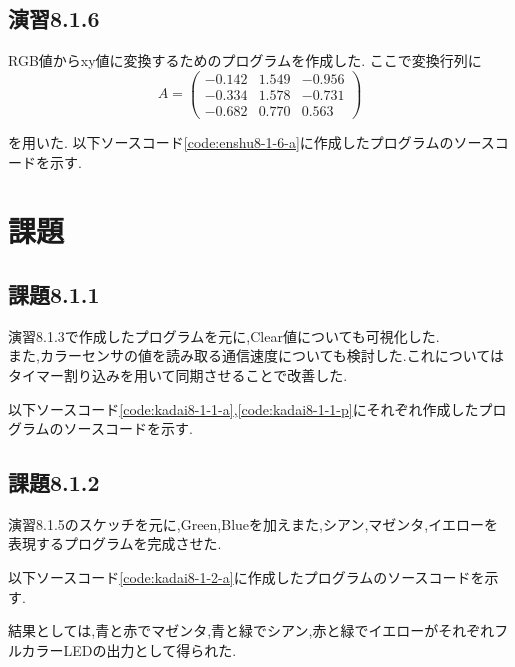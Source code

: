 \documentclass{jarticle}
\begin{document}
\subsection{演習8.1.6}
RGB値からxy値に変換するためのプログラムを作成した.
ここで変換行列に
\begin{equation}
A = 
\begin{pmatrix}
-0.142 & 1.549 & -0.956 \\
-0.334 & 1.578 & -0.731 \\
-0.682 & 0.770 & 0.563 
\end{pmatrix}
\end{equation}

を用いた.
以下ソースコード\ref{code:enshu8-1-6-a}に作成したプログラムのソースコードを示す.



\section{課題}
\subsection{課題8.1.1}
演習8.1.3で作成したプログラムを元に,Clear値についても可視化した.\\
また,カラーセンサの値を読み取る通信速度についても検討した.これについてはタイマー割り込みを用いて同期させることで改善した.

以下ソースコード\ref{code:kadai8-1-1-a},\ref{code:kadai8-1-1-p}にそれぞれ作成したプログラムのソースコードを示す.






\subsection{課題8.1.2}
演習8.1.5のスケッチを元に,Green,Blueを加えまた,シアン,マゼンタ,イエローを表現するプログラムを完成させた.

以下ソースコード\ref{code:kadai8-1-2-a}に作成したプログラムのソースコードを示す.



結果としては,青と赤でマゼンタ,青と緑でシアン,赤と緑でイエローがそれぞれフルカラーLEDの出力として得られた.
\end{document}
